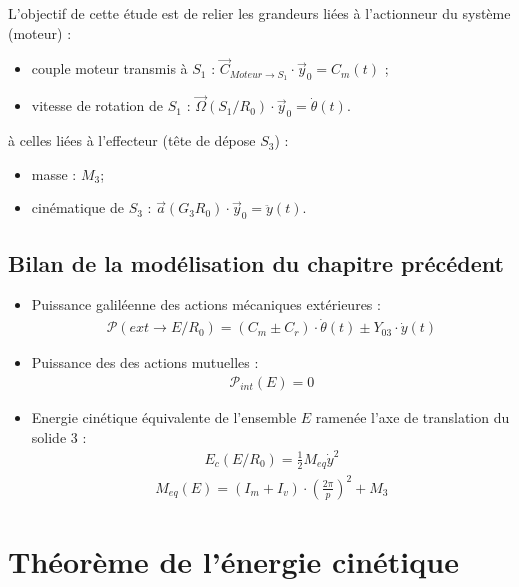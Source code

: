 \documentclass[a4paper,10pt]{article}
\begin{document}
\begin{objectif}
L'objectif de cette étude est de relier les grandeurs liées à l'actionneur du système (moteur) :
\begin{itemize}
\item couple moteur transmis à $S_1$ : $\overrightarrow{C}_{Moteur\to S_1}\cdot \overrightarrow{y}_0=C_m(t)$ ;
\item vitesse de rotation de $S_1$ : $\overrightarrow{\Omega}(S_1/R_0)\cdot \overrightarrow{y}_0=\dot{\theta}(t)$.
\end{itemize} 
à celles liées à l'effecteur (tête de dépose $S_3$) : 
\begin{itemize}
\item masse : $M_3$;
\item cinématique de $S_3$ : $\overrightarrow{a}(G_3R_0)\cdot \overrightarrow{y}_0=\ddot{y}(t)$.
\end{itemize}
\end{objectif}

\subsection{Bilan de la modélisation du chapitre précédent}
\begin{bilan}
\begin{itemize}
\item Puissance galiléenne des actions mécaniques extérieures : 
\begin{align*}
\mathcal{P}(ext \rightarrow E/R_0)=\left(C_m\pm C_r\right)\cdot \dot{\theta}(t)\pm Y_{03}\cdot \dot{y}(t)
\end{align*}
\item Puissance des des actions mutuelles : 
\begin{align*}
\mathcal{P}_{int}(E)=0
\end{align*}
\item Energie cinétique équivalente de l'ensemble $E$ ramenée l'axe de translation du solide 3 : 
\begin{align*}
E_c(E/R_0)=\frac{1}{2}M_{eq}\dot{y}^2
\end{align*}
\begin{align*}
M_{eq}(E)=\left(I_m+I_v\right)\cdot \left(\frac{2\pi}{p}\right)^2+ M_3
\end{align*}
\end{itemize}
\end{bilan}


\section{Théorème de l'énergie cinétique}
\end{document}
